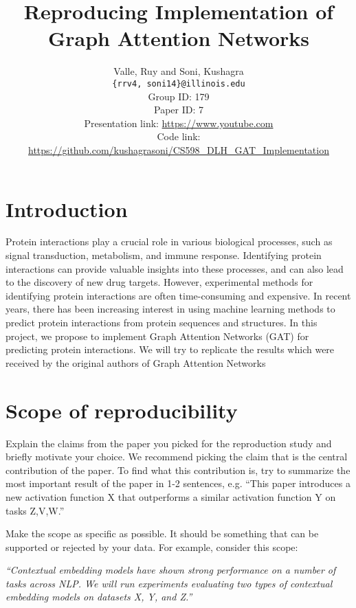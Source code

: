 \documentclass[11pt,a4paper]{article}
\title{Reproducing Implementation of Graph Attention Networks}
\author{Valle, Ruy and Soni, Kushagra \\
\texttt{\{rrv4, soni14\}@illinois.edu}
\\[2em]
Group ID: 179\\
Paper ID: 7\\
Presentation link: \url{https://www.youtube.com} \\
Code link: \url{https://github.com/kushagrasoni/CS598_DLH_GAT_Implementation}}
\begin{document}
    \maketitle



    \section{Introduction}\label{sec:introduction}
    Protein interactions play a crucial role in various biological processes, such as signal transduction,
    metabolism, and immune response.
    Identifying protein interactions can provide valuable insights into these processes, and can also lead to the discovery of new drug targets.
    However, experimental methods for identifying protein interactions are often time-consuming and expensive.
    In recent years, there has been increasing interest in using machine learning methods to predict protein interactions from protein sequences and structures.
    In this project, we propose to implement Graph Attention Networks (GAT) for predicting protein interactions.
    We will try to replicate the results which were received by the original authors of Graph Attention
    Networks~\cite{velickovic2018graph}


    \section{Scope of reproducibility}\label{sec:scope-of-reproducibility}

    Explain the claims from the paper you picked for the reproduction study and briefly motivate your choice. We recommend picking the claim that is the central contribution of the paper. To find what this contribution is, try to summarize the most important result of the paper in 1-2 sentences, e.g. ``This paper introduces a new activation function X that outperforms a similar activation function Y on tasks Z,V,W.''

    Make the scope as specific as possible. It should be something that can be supported or rejected by your data. For example, consider this scope:

    \textit{``Contextual embedding models have shown strong performance on a number of tasks across NLP. We will run experiments evaluating two types of contextual embedding models on datasets X, Y, and Z.''}
\end{document}
